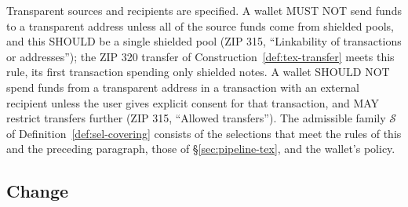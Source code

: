 \documentclass[11pt,a4paper]{article}
\theoremstyle{definition}
\begin{document}
Transparent sources and recipients are specified. A wallet MUST NOT send
funds to a transparent address unless all of the source funds come from
shielded pools, and this SHOULD be a single shielded pool (ZIP 315,
``Linkability of transactions or addresses''); the ZIP 320 transfer of
Construction~\ref{def:tex-transfer} meets this rule, its first transaction
spending only shielded notes. A wallet SHOULD NOT spend funds from a
transparent address in a transaction with an external recipient unless the
user gives explicit consent for that transaction, and MAY restrict transfers
further (ZIP 315, ``Allowed transfers''). The admissible family
$\mathcal{S}$ of Definition~\ref{def:sel-covering} consists of the
selections that meet the rules of this and the preceding paragraph, those
of \S\ref{sec:pipeline-tex}, and the wallet's policy.

\subsection{Change}\label{sec:pipeline-change}
\end{document}
